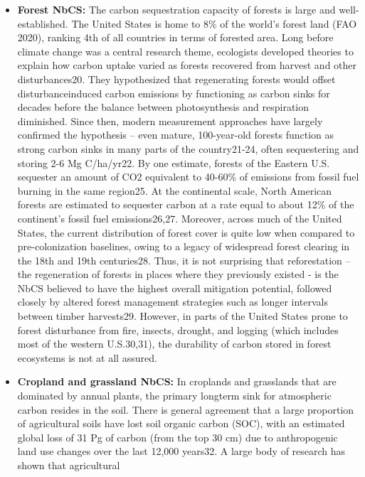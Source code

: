 \documentclass[
  letterpaper,
  DIV=11,
  numbers=noendperiod]{scrreprt}
\providecommand{\tightlist}{%
  \setlength{\itemsep}{0pt}\setlength{\parskip}{0pt}}\usepackage{longtable,booktabs,array}
\begin{document}
\begin{itemize}
\tightlist
\item
  \textbf{Forest NbCS:} The carbon sequestration capacity of forests is
  large and well-established. The United States is home to 8\% of the
  world's forest land (FAO 2020), ranking 4th of all countries in terms
  of forested area. Long before climate change was a central research
  theme, ecologists developed theories to explain how carbon uptake
  varied as forests recovered from harvest and other disturbances20.
  They hypothesized that regenerating forests would offset
  disturbanceinduced carbon emissions by functioning as carbon sinks for
  decades before the balance between photosynthesis and respiration
  diminished. Since then, modern measurement approaches have largely
  confirmed the hypothesis -- even mature, 100-year-old forests function
  as strong carbon sinks in many parts of the country21-24, often
  sequestering and storing 2-6 Mg C/ha/yr22. By one estimate, forests of
  the Eastern U.S. sequester an amount of CO2 equivalent to 40-60\% of
  emissions from fossil fuel burning in the same region25. At the
  continental scale, North American forests are estimated to sequester
  carbon at a rate equal to about 12\% of the continent's fossil fuel
  emissions26,27. Moreover, across much of the United States, the
  current distribution of forest cover is quite low when compared to
  pre-colonization baselines, owing to a legacy of widespread forest
  clearing in the 18th and 19th centuries28. Thus, it is not surprising
  that reforestation -- the regeneration of forests in places where they
  previously existed - is the NbCS believed to have the highest overall
  mitigation potential, followed closely by altered forest management
  strategies such as longer intervals between timber harvests29.
  However, in parts of the United States prone to forest disturbance
  from fire, insects, drought, and logging (which includes most of the
  western U.S.30,31), the durability of carbon stored in forest
  ecosystems is not at all assured.
\item
  \textbf{Cropland and grassland NbCS:} In croplands and grasslands that
  are dominated by annual plants, the primary longterm sink for
  atmospheric carbon resides in the soil. There is general agreement
  that a large proportion of agricultural soils have lost soil organic
  carbon (SOC), with an estimated global loss of 31 Pg of carbon (from
  the top 30 cm) due to anthropogenic land use changes over the last
  12,000 years32. A large body of research has shown that agricultural

\end{itemize}
\end{document}
